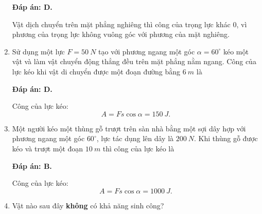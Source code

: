 \begin{enumerate}[label=\bfseries Câu \arabic*:, leftmargin=1.5cm]
	\hideall
	{	
		\textbf{Đáp án: D.}
		
		Vật dịch chuyển trên mặt phẳng nghiêng thì công của trọng lực khác $0$, vì phương của trọng lực không vuông góc với phương của mặt nghiêng.
	}
	
	\item {}
	
	
	{
		Sử dụng một lực $F=\SI{50}{N}$ tạo với phương ngang một góc $\alpha = 60^\circ$ kéo một vật và làm vật chuyển động thẳng đều trên mặt phẳng nằm ngang. Công của lực kéo khi vật di chuyển được một đoạn đường bằng $\SI{6}{m}$ là
	}
	
	\hideall
	{	
		\textbf{Đáp án: D.}
		
		Công của lực kéo:
		$$A=Fs\cos \alpha  =\SI{150}{J}.$$
		
	}
	\item {}
	
	
	{
		Một người kéo một thùng gỗ trượt trên sàn nhà bằng một sợi dây hợp với phương ngang một góc $60^\circ$, lực tác dụng lên dây là $\SI{200}{N}$. Khi thùng gỗ được kéo và trượt một đoạn $\SI{10}{m}$ thì công của lực kéo là
	}
	
	\hideall
	{	
		\textbf{Đáp án: B.}
		
		Công của lực kéo:
		$$A=Fs\cos \alpha = \SI{1000}{J}.$$
	}
	
	\item {}
	
	
	{
		Vật nào sau đây \textbf{không} có khả năng sinh công?
	}
	

\end{enumerate}
